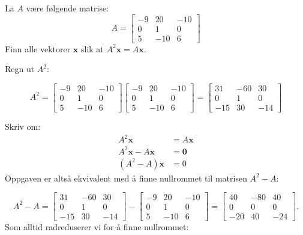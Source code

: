 \documentclass[notitlepage,a4paper,12pt,norsk]{IMFeksamen}
\DeclareMathOperator{\Sp}{Sp}
\newcommand{\V}[1]{\mathbf{#1}}
\newcommand{\vvv}[3]{\begin{bmatrix} #1 \\ #2 \\ #3 \end{bmatrix}}
\newcommand{\x}{\V{x}}
\newcommand{\0}{\V{0}}
\newcommand{\oppgslutt}{
\begin{center}
\pgfornament[width=6cm]{88}
\end{center}
}
\newenvironment{losning}{\begin{oppgave}}{\oppgslutt\end{oppgave}}
\begin{document}
\begin{losning}
La $A$ være følgende matrise:
\[
A =
\begin{bmatrix}
-9 &  20 & -10 \\
 0 &   1 &   0 \\
 5 & -10 &   6
\end{bmatrix}
\]
Finn alle vektorer $\x$ slik at $A^2 \x = A \x$.

Regn ut $A^2$:

\[
A^2=
\begin{bmatrix}
-9 &  20 & -10 \\
0 &   1 &   0 \\
5 & -10 &   6
\end{bmatrix}
\begin{bmatrix}
-9 &  20 & -10 \\
0 &   1 &   0 \\
5 & -10 &   6
\end{bmatrix}
=
\begin{bmatrix}
31 &  -60 & 30 \\
0 &   1 &   0 \\
-15 & 30 &   -14
\end{bmatrix}
\]

Skriv om: 
\begin{align*}
A^2\x&=A\x\\
A^2\x-A\x&=\0\\
(A^2-A)\x&=0
\end{align*}
Oppgaven er altså ekvivalent med å finne nullrommet til matrisen $A^2-A$:

\[
A^2-A=
\begin{bmatrix}
31 &  -60 & 30 \\
0 &   1 &   0 \\
-15 & 30 &   -14
\end{bmatrix}-
\begin{bmatrix}
-9 &  20 & -10 \\
0 &   1 &   0 \\
5 & -10 &   6
\end{bmatrix}
=
\begin{bmatrix}
40 &  -80 & 40 \\
0 &   0 &   0 \\
-20 & 40 &   -24
\end{bmatrix}.
\]
Som alltid radreduserer vi for å finne nullrommet:


\end{losning}
\end{document}
